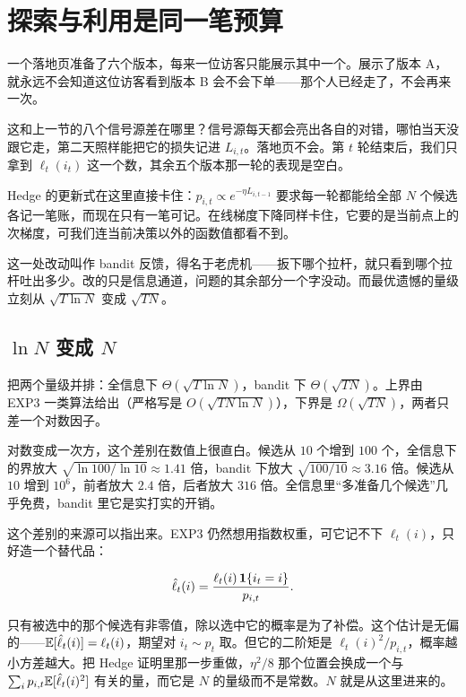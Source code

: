 \section{探索与利用是同一笔预算}
\label{sec:17-Constrained-Guarantees/04-Online-Learning-and-Regret/03}

一个落地页准备了六个版本，每来一位访客只能展示其中一个。展示了版本 A，就永远不会知道这位访客看到版本 B 会不会下单——那个人已经走了，不会再来一次。

这和上一节的八个信号源差在哪里？信号源每天都会亮出各自的对错，哪怕当天没跟它走，第二天照样能把它的损失记进 \(L_{i,t}\)。落地页不会。第 \(t\) 轮结束后，我们只拿到 \(\ell_t(i_t)\) 这一个数，其余五个版本那一轮的表现是空白。

Hedge 的更新式在这里直接卡住：\(p_{i,t}\propto e^{-\eta L_{i,t-1}}\) 要求每一轮都能给全部 \(N\) 个候选各记一笔账，而现在只有一笔可记。在线梯度下降同样卡住，它要的是当前点上的次梯度，可我们连当前决策以外的函数值都看不到。

这一处改动叫作 bandit 反馈，得名于老虎机——扳下哪个拉杆，就只看到哪个拉杆吐出多少。改的只是信息通道，问题的其余部分一个字没动。而最优遗憾的量级立刻从 \(\sqrt{T\ln N}\) 变成 \(\sqrt{TN}\)。

\subsection{\texorpdfstring{\(\ln N\) 变成 \(N\)}{ln N 变成 N}}

把两个量级并排：全信息下 \(\Theta(\sqrt{T\ln N})\)，bandit 下 \(\Theta(\sqrt{TN})\)。上界由 EXP3 一类算法给出（严格写是 \(O(\sqrt{TN\ln N})\)），下界是 \(\Omega(\sqrt{TN})\)，两者只差一个对数因子。

对数变成一次方，这个差别在数值上很直白。候选从 \(10\) 个增到 \(100\) 个，全信息下的界放大 \(\sqrt{\ln100/\ln10}\approx1.41\) 倍，bandit 下放大 \(\sqrt{100/10}\approx3.16\) 倍。候选从 \(10\) 增到 \(10^{6}\)，前者放大 \(2.4\) 倍，后者放大 \(316\) 倍。全信息里``多准备几个候选''几乎免费，bandit 里它是实打实的开销。

这个差别的来源可以指出来。EXP3 仍然想用指数权重，可它记不下 \(\ell_t(i)\)，只好造一个替代品：

\[
\hat\ell_t(i)=\frac{\ell_t(i)\,\mathbf{1}\{i_t=i\}}{p_{i,t}}.
\]

只有被选中的那个候选有非零值，除以选中它的概率是为了补偿。这个估计是无偏的——\(\mathbb{E}[\hat\ell_t(i)]=\ell_t(i)\)，期望对 \(i_t\sim p_t\) 取。但它的二阶矩是 \(\ell_t(i)^2/p_{i,t}\)，概率越小方差越大。把 Hedge 证明里那一步重做，\(\eta^2/8\) 那个位置会换成一个与 \(\sum_i p_{i,t}\mathbb{E}[\hat\ell_t(i)^2]\) 有关的量，而它是 \(N\) 的量级而不是常数。\(N\) 就是从这里进来的。

